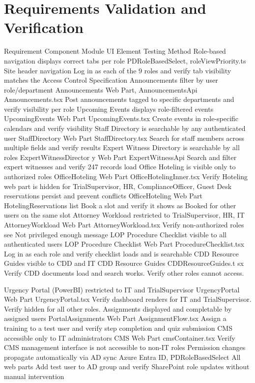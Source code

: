 \documentclass[12pt]{article}
\begin{document}
\section{Requirements Validation and Verification}

Requirement Component Module UI Element Testing Method Role-based navigation displays correct tabs per role PDRoleBasedSelect, roleViewPriority.ts Site header navigation Log in as each of the 9 roles and verify tab visibility matches the Access Control Specification Announcements filter by user role/department Announcements Web Part, AnnouncementsApi Announcements.tsx Post announcements tagged to specific departments and verify visibility per role Upcoming Events displays role-filtered events UpcomingEvents Web Part UpcomingEvents.tsx Create events in role-specific calendars and verify visibility Staff Directory is searchable by any authenticated user StaffDirectory Web Part StaffDirectory.tsx Search for staff members across multiple fields and verify results Expert Witness Directory is searchable by all roles ExpertWitnessDirector y Web Part ExpertWitnessApi Search and filter expert witnesses and verify 247 records load Office Hoteling is visible only to authorized roles OfficeHoteling Web Part OfficeHotelingInner.tsx Verify Hoteling web part is hidden for TrialSupervisor, HR, ComplianceOfficer, Guest Desk reservations persist and prevent conflicts OfficeHoteling Web Part HotelingReservations list Book a slot and verify it shows as Booked for other users on the same slot Attorney Workload restricted to TrialSupervisor, HR, IT AttorneyWorkload Web Part AttorneyWorkload.tsx Verify non-authorized roles see Not privileged enough message LOP Procedure Checklist visible to all authenticated users LOP Procedure Checklist Web Part ProcedureChecklist.tsx Log in as each role and verify checklist loads and is searchable CDD Resource Guides visible to CDD and IT CDD Resource Guides CDDResourceGuides.t sx Verify CDD documents load and search works. Verify other roles cannot access.

Urgency Portal (PowerBI) restricted to IT and TrialSupervisor UrgencyPortal Web Part UrgencyPortal.tsx Verify dashboard renders for IT and TrialSupervisor. Verify hidden for all other roles. Assignments displayed and completable by assigned users PortalAssignments Web Part AssignmentFlow.tsx Assign a training to a test user and verify step completion and quiz submission CMS accessible only to IT administrators CMS Web Part cmsContainer.tsx Verify CMS management interface is not accessible to non-IT roles Permission changes propagate automatically via AD sync Azure Entra ID, PDRoleBasedSelect All web parts Add test user to AD group and verify SharePoint role updates without manual intervention
\end{document}
